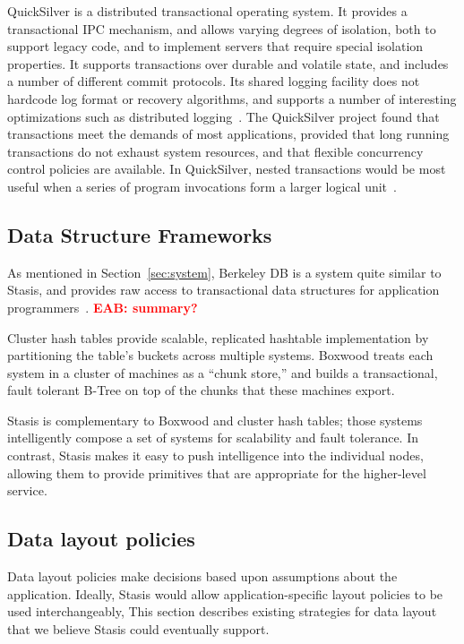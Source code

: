 \documentclass[letterpaper,twocolumn,10pt]{article}
\newcommand{\yad}{Stasis\xspace}
\newcommand{\eab}[1]{\textcolor{red}{\bf EAB: #1}}
\begin{document}
QuickSilver is a distributed transactional operating system.  It
provides a transactional IPC mechanism, and
allows varying degrees of isolation, both to support legacy code, and
to implement servers that require special isolation properties.  It
supports transactions over durable and volatile state, and includes a
number of different commit protocols.  Its shared logging facility does not
hardcode log format or recovery algorithms, and supports a number
of interesting optimizations such as distributed
logging~\cite{recoveryInQuickSilver}.  The QuickSilver project found
that transactions meet the demands of most
applications, provided that long running transactions do not exhaust
system resources, and that flexible concurrency control policies are
available.  In QuickSilver, nested transactions would
be most useful when a series of program invocations
form a larger logical unit~\cite{experienceWithQuickSilver}.

\subsection{Data Structure Frameworks}

As mentioned in Section~\ref{sec:system}, Berkeley DB is a system
quite similar to \yad, and provides raw access to
transactional data structures for application
programmers~\cite{libtp}.  \eab{summary?}

Cluster hash tables provide scalable, replicated hashtable
implementation by partitioning the table's buckets across multiple
systems.  Boxwood treats each system in a cluster of machines as a
``chunk store,'' and builds a transactional, fault tolerant B-Tree on
top of the chunks that these machines export.  

\yad is complementary to Boxwood and cluster hash tables; those
systems intelligently compose a set of systems for scalability and
fault tolerance.  In contrast, \yad makes it easy to push intelligence
into the individual nodes, allowing them to provide primitives that
are appropriate for the higher-level service.  



\subsection{Data layout policies}
\label{sec:malloc}
Data layout policies make decisions based upon
assumptions about the application.  Ideally, \yad would allow
application-specific layout policies to be used interchangeably, 
This section describes existing strategies for data
layout that we believe \yad could eventually support.
\end{document}

